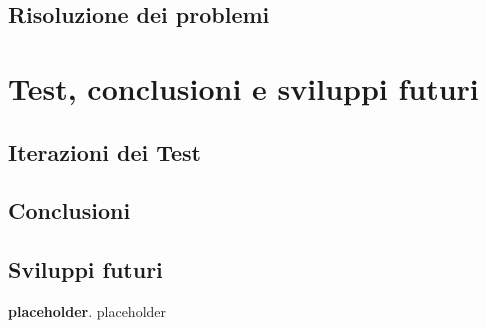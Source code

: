 \documentclass[a4paper,10pt]{memoir}
\begin{document}
\section{Risoluzione dei problemi}


\chapter{Test, conclusioni e sviluppi futuri}

\section{Iterazioni dei Test}

\section{Conclusioni}

\section{Sviluppi futuri}



\begin{thebibliography}{9}

	\textbf{placeholder}.
	placeholder

\end{thebibliography}
\end{document}
